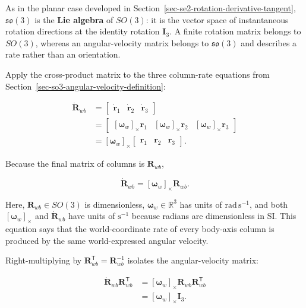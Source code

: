 \documentclass[
  australian,
  12pt,
  letterpaper,
  DIV=11,
  numbers=noendperiod,
  twoside]{scrreprt}
\begin{document}
As in the planar case developed in
Section~\ref{sec-se2-rotation-derivative-tangent}, \(\mathfrak{so}(3)\)
is the \textbf{Lie algebra} of \(SO(3)\): it is the vector space of
instantaneous rotation directions at the identity rotation
\(\mathbf I_3\). A finite rotation matrix belongs to \(SO(3)\), whereas
an angular-velocity matrix belongs to \(\mathfrak{so}(3)\) and describes
a rate rather than an orientation.

Apply the cross-product matrix to the three column-rate equations from
Section~\ref{sec-so3-angular-velocity-definition}:

\[
\begin{aligned}
\dot{\mathbf R}_{wb}
&=
\begin{bmatrix}
\dot{\mathbf r}_1&\dot{\mathbf r}_2&\dot{\mathbf r}_3
\end{bmatrix}\\
&=
\begin{bmatrix}
[\boldsymbol\omega_w]_\times\mathbf r_1&
[\boldsymbol\omega_w]_\times\mathbf r_2&
[\boldsymbol\omega_w]_\times\mathbf r_3
\end{bmatrix}\\
&=
[\boldsymbol\omega_w]_\times
\begin{bmatrix}
\mathbf r_1&\mathbf r_2&\mathbf r_3
\end{bmatrix}.
\end{aligned}
\]

Because the final matrix of columns is \(\mathbf R_{wb}\),

\[
\boxed{
\dot{\mathbf R}_{wb}
=
[\boldsymbol\omega_w]_\times\mathbf R_{wb}
}.
\]

Here, \(\mathbf R_{wb}\in SO(3)\) is dimensionless,
\(\boldsymbol\omega_w\in\mathbb R^3\) has units of
\(\mathrm{rad\,s^{-1}}\), and both \([\boldsymbol\omega_w]_\times\) and
\(\dot{\mathbf R}_{wb}\) have units of \(\mathrm{s^{-1}}\) because
radians are dimensionless in SI. This equation says that the
world-coordinate rate of every body-axis column is produced by the same
world-expressed angular velocity.

Right-multiplying by \(\mathbf R_{wb}^\mathsf T=\mathbf R_{wb}^{-1}\)
isolates the angular-velocity matrix:

\[
\begin{aligned}
\dot{\mathbf R}_{wb}\mathbf R_{wb}^\mathsf T
&=
[\boldsymbol\omega_w]_\times
\mathbf R_{wb}\mathbf R_{wb}^\mathsf T\\
&=
[\boldsymbol\omega_w]_\times\mathbf I_3.
\end{aligned}
\]
\end{document}
